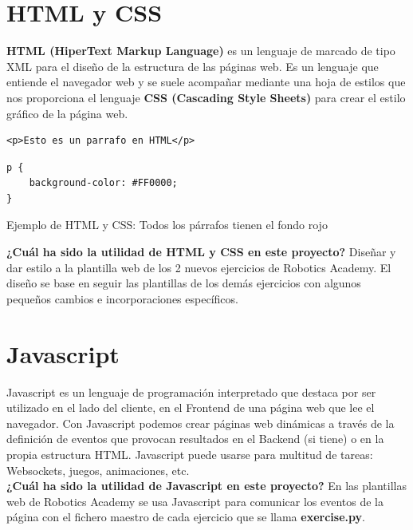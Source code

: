 \section{HTML y CSS}
\label{sec:html_css}

\textbf{HTML (HiperText Markup Language)} es un lenguaje de marcado de tipo XML para el diseño de la estructura de las páginas web. Es un lenguaje que entiende el navegador web y se suele acompañar mediante una hoja de estilos que nos proporciona el lenguaje \textbf{CSS (Cascading Style Sheets)} para crear el estilo gráfico de la página web.\\


\begin{code}[H]
\begin{lstlisting}
<p>Esto es un parrafo en HTML</p>
\end{lstlisting}
\begin{lstlisting}
p {
	background-color: #FF0000;
}
\end{lstlisting}
\caption[Ejemplo de HTML y CSS]{Ejemplo de HTML y CSS: Todos los párrafos tienen el fondo rojo}
\label{cod:codigo_urdf}
\end{code}

\textbf{¿Cuál ha sido la utilidad de HTML y CSS en este proyecto?} Diseñar y dar estilo a la plantilla web de los 2 nuevos ejercicios de Robotics Academy. El diseño se base en seguir las plantillas de los demás ejercicios con algunos pequeños cambios e incorporaciones específicos.



\section{Javascript}
\label{sec:javascript}

Javascript es un lenguaje de programación interpretado que destaca por ser utilizado en el lado del cliente, en el Frontend de una página web que lee el navegador. Con Javascript podemos crear páginas web dinámicas a través de la definición de eventos que provocan resultados en el Backend (si tiene) o en la propia estructura HTML. Javascript puede usarse para multitud de tareas: Websockets, juegos, animaciones, etc.\\

\textbf{¿Cuál ha sido la utilidad de Javascript en este proyecto?}
En las plantillas web de Robotics Academy se usa Javascript para comunicar los eventos de la página con el fichero maestro de cada ejercicio que se llama \textbf{exercise.py}.\\



